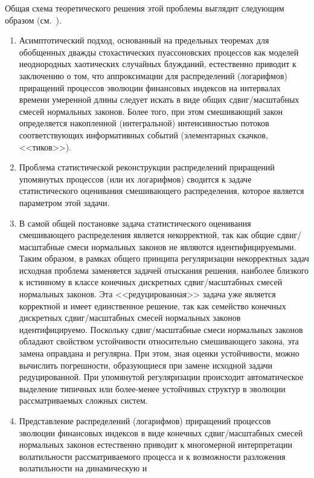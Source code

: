 \begin{multicols}{2}
Общая схема теоретического решения этой проб\-ле\-мы выглядит
следующим образом (см.~\cite{2k}).
\begin{enumerate}[($i$)]
\item Асимптотический подход, основанный на предельных
теоремах для обобщенных дважды стохастических пуассоновских
процессов как моделей неоднородных хаотических случайных
блужданий, естественно приводит к заключению о том, что
аппроксимации для распределений (логарифмов) приращений\linebreak
процессов
эволюции финансовых индексов на интервалах времени умеренной длины
следует искать в виде общих сдвиг/масштабных смесей нормальных
законов. Более \mbox{того}, при этом смешивающий закон определяется
накопленной (интегральной) интенсивностью потоков соответствующих
информативных событий (элементарных скачков,\linebreak <<тиков>>).
\item
Проблема статистической реконструкции распределений
приращений упомянутых процессов (или их логарифмов) сводится к
задаче статистического оценивания смешивающего распределения,
которое является параметром этой задачи.
\item
В самой общей постановке задача статистического
оценивания смешивающего распределения является некорректной, так
как общие сдвиг/масштабные смеси нормальных законов не являются
идентифицируемыми. Таким образом, в рамках общего принципа
регуляризации некорректных задач исходная проблема заменяется
задачей отыскания решения, наиболее близкого к истинному в классе
конечных дискретных сдвиг/масштабных смесей нормальных законов.
Эта <<редуцированная>> задача уже является корректной и имеет
единственное решение, так как семейство конечных дискретных
сдвиг/масштабных смесей нормальных законов идентифицируемо.
Поскольку сдвиг/масштабные смеси нормальных законов обладают
свойством устойчивости относительно смешивающего закона, эта
замена оправдана и регулярна. При этом, зная оценки устойчивости,
можно вычислить погрешности, образующиеся при замене исходной
задачи редуцированной. При упомянутой регуляризации происходит
автоматическое выделение типичных или более-менее устойчивых
структур в эволюции рассматриваемых сложных систем.
\item
Представление распределений (логарифмов) приращений
процессов эволюции фи\-нан\-со\-вых индексов в виде конечных
сдвиг/масштабных смесей нормальных законов естественно приводит к
многомерной интерпретации волатильности рассматрива\-емого процесса
и к возможности разложения волатильности на динамическую и

\end{enumerate}
\end{multicols}
